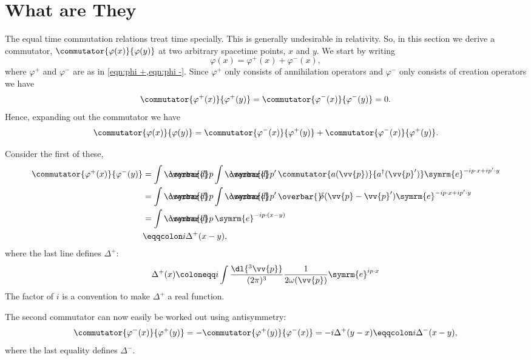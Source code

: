 \documentclass[fleqn]{NotesClass}
\newcommand{\e}{\symrm{e}}
\newcommand{\hermit}{{\dagger}}
\newcommand\dbar{\ThisStyle{\ensurestackMath{%
            \stackengine{-.3\LMpt}{\SavedStyle \symrm{d}}{\SavedStyle\overbar{}%
                \mkern2.25mu}{O}{r}{F}{F}{L}}}}
\newcommand{\invariantmeasure}[1]{\dbar #1}
\newcommand\bardelta{\ThisStyle{\ensurestackMath{%
            \stackengine{-.3\LMpt}{\SavedStyle \delta}{\SavedStyle\overbar{}%
                \mkern4.5mu}{O}{r}{F}{F}{L}}}}
\begin{document}
    \section{What are They}
    The equal time commutation relations treat time specially.
    This is generally undesirable in relativity.
    So, in this section we derive a commutator, \(\commutator{\varphi(x)}{\varphi(y)}\) at two arbitrary spacetime points, \(x\) and \(y\).
    We start by writing
    \begin{equation}
        \varphi(x) = \varphi^+(x) + \varphi^-(x),
    \end{equation}
    where \(\varphi^+\) and \(\varphi^-\) are as in \cref{eqn:phi +,eqn:phi -}.
    Since \(\varphi^+\) only consists of annihilation operators and \(\varphi^-\) only consists of creation operators we have
    \begin{equation}
        \commutator{\varphi^+(x)}{\varphi^+(y)} = \commutator{\varphi^-(x)}{\varphi^-(y)} = 0.
    \end{equation}
    Hence, expanding out the commutator we have
    \begin{equation}
        \commutator{\varphi(x)}{\varphi(y)} = \commutator{\varphi^-(x)}{\varphi^+(y)} + \commutator{\varphi^-(x)}{\varphi^+(y)}.
    \end{equation}
    
    Consider the first of these,
    \begin{align}
        \commutator{\varphi^+(x)}{\varphi^-(y)} &= \int \invariantmeasure{p} \int \invariantmeasure{p'} \, \commutator{a(\vv{p})}{a^\hermit(\vv{p}')} \e^{-ip\cdot x + ip'\cdot y}\\
        &= \int \invariantmeasure{p} \int \invariantmeasure{p'} \, \bardelta(\vv{p} - \vv{p}') \e^{-ip\cdot x + ip' \cdot y}\\
        &= \int \invariantmeasure{p} \, \e^{-ip \cdot (x - y)}\\
        &\eqqcolon i\Delta^+(x - y),
    \end{align}
    where the last line defines \(\Delta^+\):
    \begin{equation}
        \Delta^+(x) \coloneqq i \int \frac{\dl{^3\vv{p}}}{(2\pi)^3} \frac{1}{2\omega(\vv{p})} \e^{ip\cdot x}
    \end{equation}
    The factor of \(i\) is a convention to make \(\Delta^+\) a real function.
    
    The second commutator can now easily be worked out using antisymmetry:
    \begin{equation}
        \commutator{\varphi^-(x)}{\varphi^+(y)} = -\commutator{\varphi^+(y)}{\varphi^-(x)} = -i\Delta^+(y - x) \eqqcolon i\Delta^-(x - y),
    \end{equation}
    where the last equality defines \(\Delta^-\).
    
\end{document}
